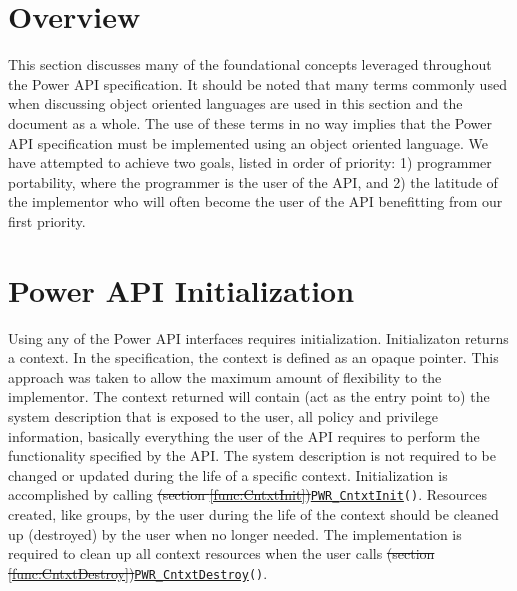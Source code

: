 \documentclass[12pt]{report} %
\def\PWR#1{\texttt{PWR\_{#1}}}%
\newcommand\funcref[1]{\hyperref[func:#1]{\PWR{#1}}\texttt{()}\marginnote{\scriptsize{p.~\pageref{func:#1}}}} %
\providecommand{\DIFdeltex}[1]{{\protect\color{red}\sout{#1}}}                      %
\providecommand{\DIFaddbegin}{} %
\providecommand{\DIFaddend}{} %
\providecommand{\DIFdelbegin}{} %
\providecommand{\DIFdelend}{} %
\providecommand{\DIFdel}[1]{\texorpdfstring{\DIFdeltex{#1}}{}} %
\newcommand{\DIFscaledelfig}{0.5}
\newlength{\DIFdelgraphicswidth} %
\newlength{\DIFdelgraphicsheight} %
\newcommand{\DIFaddincludegraphics}[2][]{{\color{blue}\fbox{\DIFOincludegraphics[#1]{#2}}}} %
\newcommand{\DIFdelincludegraphics}[2][]{%
\sbox{\DIFdelgraphicsbox}{\DIFOincludegraphics[#1]{#2}}%
\settoboxwidth{\DIFdelgraphicswidth}{\DIFdelgraphicsbox} %
\settoboxtotalheight{\DIFdelgraphicsheight}{\DIFdelgraphicsbox} %
\scalebox{\DIFscaledelfig}{%
\parbox[b]{\DIFdelgraphicswidth}{\usebox{\DIFdelgraphicsbox}\\[-\baselineskip] \rule{\DIFdelgraphicswidth}{0em}}\llap{\resizebox{\DIFdelgraphicswidth}{\DIFdelgraphicsheight}{%
\setlength{\unitlength}{\DIFdelgraphicswidth}%
\begin{picture}(1,1)%
\thicklines\linethickness{2pt} %
{\color[rgb]{1,0,0}\put(0,0){\framebox(1,1){}}}%
{\color[rgb]{1,0,0}\put(0,0){\line( 1,1){1}}}%
{\color[rgb]{1,0,0}\put(0,1){\line(1,-1){1}}}%
\end{picture}%
}\hspace*{3pt}}} %
} %
\DeclareRobustCommand{\DIFaddbegin}{\DIFOaddbegin \let\includegraphics\DIFaddincludegraphics} %
\DeclareRobustCommand{\DIFaddend}{\DIFOaddend \let\includegraphics\DIFOincludegraphics} %
\DeclareRobustCommand{\DIFdelbegin}{\DIFOdelbegin \let\includegraphics\DIFdelincludegraphics} %
\DeclareRobustCommand{\DIFdelend}{\DIFOaddend \let\includegraphics\DIFOincludegraphics} %
\begin{document}
\section{Overview}
This section discusses many of the foundational concepts leveraged throughout the Power API specification.
It should be noted that many terms commonly used when discussing object oriented languages are used in this section and the document as a whole.
The use of these terms in no way implies that the Power API specification must be implemented using an object oriented language.
We have attempted to achieve two goals, listed in order of priority: 1) programmer portability, where the programmer is the user of the API, and 2) the latitude of the implementor who will often become the user of the API benefitting from our first priority. 

\section{Power API Initialization}\label{sec:PowerAPIInit}


Using any of the Power API interfaces requires initialization. 
Initializaton returns a context.
In the specification, the context is defined as an opaque pointer.
This approach was taken to allow the maximum amount of flexibility to the implementor.
The context returned will contain (act as the entry point to) the system description that is exposed to the user, all policy and privilege information, basically everything the user of the API requires to perform the functionality specified by the API.
The system description is not required to be changed or updated during the life of a specific context.
Initialization is accomplished by calling \DIFdelbegin %
\DIFdel{(section \ref{func:CntxtInit})}\DIFdelend \DIFaddbegin \funcref{CntxtInit}\DIFaddend .
Resources created, like groups, by the user during the life of the context should be cleaned up (destroyed) by the user when no longer needed. 
The implementation is required to clean up all context resources when the user calls \DIFdelbegin %
\DIFdel{(section \ref{func:CntxtDestroy})}\DIFdelend \DIFaddbegin \funcref{CntxtDestroy}\DIFaddend .
\end{document}
